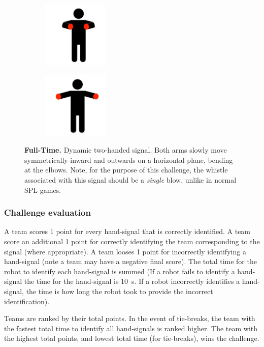         \begin{figure}[ht!]
            \centering
            \begin{subfigure}{.33\textwidth}
                \includegraphics[height=120px]{figs/referee-signals/full-time-start.png}
            \end{subfigure}
            \begin{subfigure}{.33\textwidth}
                \includegraphics[height=120px]{figs/referee-signals/full-time-end.png}
            \end{subfigure}
            \caption{\textbf{Full-Time.}
            Dynamic two-handed signal. Both arms slowly move symmetrically inward and outwards on a horizontal plane, bending at the elbows. Note, for the purpose of this challenge, the whistle associated with this signal should be a \textit{single} blow, unlike in normal SPL games.}
        \end{figure}

    \subsubsection{Challenge evaluation}
        A team scores 1 point for every hand-signal that is correctly identified. A team score an additional 1 point for correctly identifying the team corresponding to the signal (where appropriate). A team looses 1 point for incorrectly identifying a hand-signal (note a team may have a negative final score). The total time for the robot to identify each hand-signal is summed (If a robot fails to identify a hand-signal the time for the hand-signal is \qty{10}{\second}. If a robot incorrectly identifies a hand-signal, the time is how long the robot took to provide the incorrect identification).
    
        Teams are ranked by their total points. In the event of tie-breaks, the team with the fastest total time to identify all hand-signals is ranked higher. The team with the highest total points, and lowest total time (for tie-breaks), wins the challenge.

